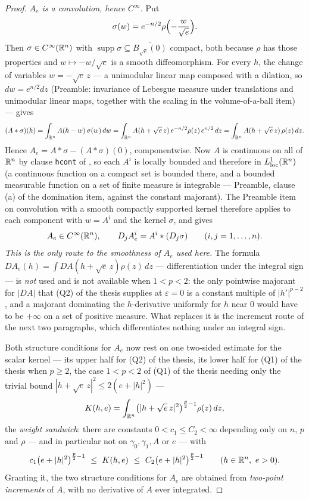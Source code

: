 \begin{proof}
\emph{$A_e$ is a convolution, hence $C^\infty$.}  Put
\[
\sigma(w)=e^{-n/2}\rho\Bigl(-\frac w{\sqrt e}\Bigr).
\]
Then $\sigma\in C^\infty(\mathbb{R}^n)$ with
$\operatorname{supp}\sigma\subseteq\overline{B_{\sqrt e}(0)}$ compact, both
because $\rho$ has those properties and $w\mapsto-w/\sqrt e$ is a smooth
diffeomorphism.  For every $h$, the change of variables $w=-\sqrt e\,z$ --- a
unimodular linear map composed with a dilation, so $dw=e^{n/2}dz$ (Preamble:
invariance of Lebesgue measure under translations and unimodular linear maps,
together with the scaling in the volume-of-a-ball item) --- gives
\[
(A*\sigma)(h)=\int_{\mathbb{R}^n}A(h-w)\,\sigma(w)\,dw
=\int_{\mathbb{R}^n}A(h+\sqrt e\,z)\,e^{-n/2}\rho(z)\,e^{n/2}\,dz
=\int_{\mathbb{R}^n}A(h+\sqrt e\,z)\,\rho(z)\,dz .
\]
Hence $A_e=A*\sigma-(A*\sigma)(0)$, componentwise.  Now $A$ is continuous on all
of $\mathbb{R}^n$ by clause \texttt{hcont} of , so each
$A^i$ is locally bounded and therefore in $L^1_{\mathrm{loc}}(\mathbb{R}^n)$ (a
continuous function on a compact set is bounded there, and a bounded measurable
function on a set of finite measure is integrable --- Preamble, clause (a) of the
domination item, against the constant majorant).  The Preamble item on
convolution with a smooth compactly supported kernel therefore applies to each
component with $w=A^i$ and the kernel $\sigma$, and gives
\[
A_e\in C^\infty(\mathbb{R}^n),
\qquad
D_j A_e^i=A^i*(D_j\sigma)\qquad(i,j=1,\dots,n).
\]
\emph{This is the only route to the smoothness of $A_e$ used here.}  The formula
$DA_e(h)=\int DA(h+\sqrt e\,z)\rho(z)\,dz$ --- differentiation under the integral
sign --- is \emph{not} used and is not available when $1<p<2$: the only
pointwise majorant for $|DA|$ that (Q2) of the thesis supplies at $\varepsilon=0$ is a
constant multiple of $|h'|^{p-2}$, and a majorant dominating the $h$-derivative
uniformly for $h$ near $0$ would have to be $+\infty$ on a set of positive
measure.  What replaces it is the increment route of the next two paragraphs,
which differentiates nothing under an integral sign.

Both structure conditions for $A_e$ now rest on one two-sided estimate for the
scalar kernel --- its upper half for (Q2) of the thesis, its lower half for
(Q1) of the thesis when $p\ge2$, the case $1<p<2$ of (Q1) of the thesis needing only the
trivial bound $|h+\sqrt e\,z|^2\le2(e+|h|^2)$ ---
\[
K(h,e)=\int_{\mathbb{R}^n}\bigl(|h+\sqrt e\,z|^2\bigr)^{\frac p2-1}\rho(z)\,dz ,
\]
the \emph{weight sandwich}: there are constants $0<c_1\le C_2<\infty$ depending
only on $n$, $p$ and $\rho$ --- and in particular not on $\gamma_0,\gamma_1,A$
or $e$ --- with
\[
c_1\bigl(e+|h|^2\bigr)^{\frac p2-1}\ \le\ K(h,e)\ \le\ C_2\bigl(e+|h|^2\bigr)^{\frac p2-1}
\qquad(h\in\R^n,\ e>0).
\]
Granting it, the two structure conditions for $A_e$ are obtained from
\emph{two-point increments} of $A$, with no derivative of $A$ ever integrated.


\end{proof}

